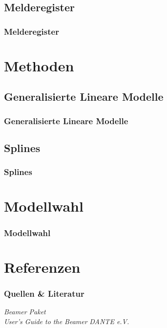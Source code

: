 \documentclass{beamer}
\begin{document}
\subsection{Melderegister}
\begin{frame}\frametitle{Melderegister}

\end{frame}

\section{Methoden} 
\subsection{Generalisierte Lineare Modelle}
\begin{frame}
\frametitle{Generalisierte Lineare Modelle}

\end{frame}

\subsection{Splines}
\begin{frame}
\frametitle{Splines}

\end{frame}


\section{Modellwahl}
\begin{frame}\frametitle{Modellwahl}

\end{frame}

\section[Quellen]{Referenzen}
\begin{frame}\frametitle{Quellen \& Literatur}

\begin{thebibliography}{9}
 \emph{Beamer Paket} \\ 
 \emph{User's Guide to the Beamer} 
 \emph{DANTE e.V.}    
\end{thebibliography}


\end{frame}
\end{document}
